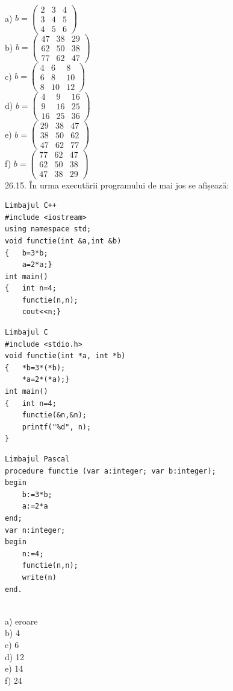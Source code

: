 \\
a) $b=\left(\begin{array}{lll}2 & 3 & 4 \\ 3 & 4 & 5 \\ 4 & 5 & 6\end{array}\right)$
\\
b) $b=\left(\begin{array}{lll}47 & 38 & 29 \\ 62 & 50 & 38 \\ 77 & 62 & 47\end{array}\right)$
\\
c) $b=\left(\begin{array}{ccc}4 & 6 & 8 \\ 6 & 8 & 10 \\ 8 & 10 & 12\end{array}\right)$
\\
d) $b=\left(\begin{array}{ccc}4 & 9 & 16 \\ 9 & 16 & 25 \\ 16 & 25 & 36\end{array}\right)$
\\
e) $b=\left(\begin{array}{lll}29 & 38 & 47 \\ 38 & 50 & 62 \\ 47 & 62 & 77\end{array}\right)$
\\
f) $b=\left(\begin{array}{lll}77 & 62 & 47 \\ 62 & 50 & 38 \\ 47 & 38 & 29\end{array}\right)$
\\
26.15. În urma executării programului de mai jos se afișează:
\begin{verbatim}
Limbajul C++
#include <iostream>
using namespace std;
void functie(int &a,int &b)
{   b=3*b;
    a=2*a;}
int main()
{   int n=4;
    functie(n,n);
    cout<<n;}
\end{verbatim}
\begin{verbatim}
Limbajul C
#include <stdio.h>
void functie(int *a, int *b)
{   *b=3*(*b);
    *a=2*(*a);}
int main()
{   int n=4;
    functie(&n,&n);
    printf("%d", n);
}
\end{verbatim}
\begin{verbatim}
Limbajul Pascal
procedure functie (var a:integer; var b:integer);
begin
    b:=3*b;
    a:=2*a
end;
var n:integer;
begin
    n:=4;
    functie(n,n);
    write(n)
end.
\end{verbatim}
\\
a) eroare
\\
b) 4
\\
c) 6
\\
d) 12
\\
e) 14
\\
f) 24
\\

